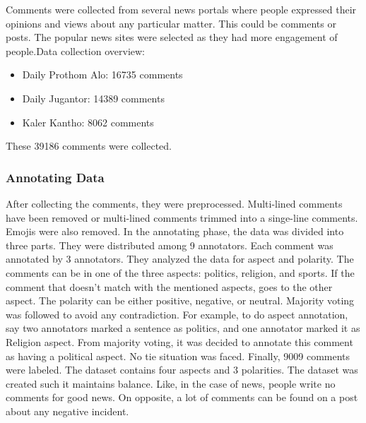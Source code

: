 \documentclass[a4paper,12pt]{article}
\begin{document}
Comments were collected from several news portals where people expressed their opinions and views about any particular matter. This could be comments or posts. The popular news sites were selected as they had more engagement of people.Data collection overview:
    \begin{itemize}
    \item Daily Prothom Alo: 16735 comments
    \item Daily Jugantor: 14389 comments
    \item Kaler Kantho: 8062 comments
\end{itemize}
These 39186 comments were collected.
\subsubsection{Annotating Data}
After collecting the comments, they were preprocessed. Multi-lined comments have been removed or multi-lined comments trimmed into a singe-line comments. Emojis were also removed.\newline
In the annotating phase, the data was divided into three parts. They were distributed among 9 annotators. Each comment was annotated by 3 annotators. They analyzed the data for aspect and polarity. The comments can be in one of the three aspects: politics, religion, and sports. If the comment
that doesn't match with the mentioned aspects, goes to the other aspect.
The polarity can be either positive, negative, or neutral. Majority voting was followed to avoid any contradiction.\newline
For example, to do aspect annotation, say two annotators marked a sentence as politics, and one annotator marked it as Religion
aspect. From majority voting, it was decided to annotate this comment as
having a political aspect. No tie situation was faced.\newline
Finally, 9009 comments were labeled. The dataset contains
four aspects and 3 polarities. The dataset was created such it maintains balance. Like, in the case of news, people write no comments for good news. On opposite, a lot of comments can be found on a post about any negative incident.
\end{document}
